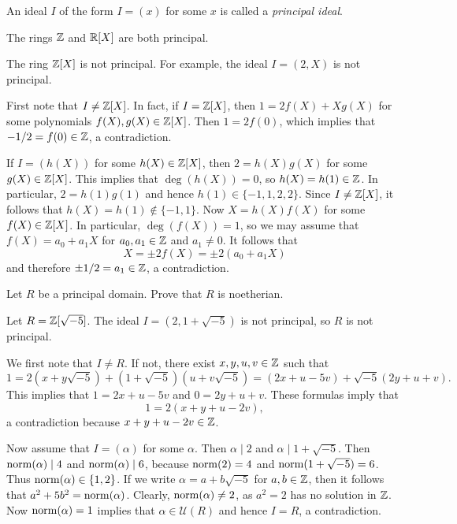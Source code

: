 An ideal $I$ of the form $I=(x)$ for some $x$ is called a \emph{principal ideal}. 

The rings $\mathbb{Z}$ and $\mathbb{R}[X]$ are both principal. 

\begin{example}
	The ring $\mathbb{Z}[X]$ is not principal. For example, the ideal
	$I=(2,X)$ is not principal. 
	
	First note that $I\ne\mathbb{Z}[X]$. In fact, if $I=\mathbb{Z}[X]$, then 
	$1=2f(X)+Xg(X)$ for some polynomials $f(X),g(X)\in\mathbb{Z}[X]$. Then 
	$1=2f(0)$, which implies that $-1/2=f(0)\in\mathbb{Z}$, a contradiction. 
	
	If $I=(h(X))$ for some $h(X)\in\mathbb{Z}[X]$, then $2=h(X)g(X)$ for some $g(X)\in\mathbb{Z}[X]$. This
	implies that $\deg(h(X))=0$, so $h(X)=h(1)\in\mathbb{Z}$. In particular, $2=h(1)g(1)$ and hence
	$h(1)\in\{-1,1,2,2\}$. Since $I\ne\mathbb{Z}[X]$, it follows that $h(X)=h(1)\not\in\{-1,1\}$. Now      
	$X=h(X)f(X)$ for some $f(X)\in\mathbb{Z}[X]$. In particular, $\deg(f(X))=1$, so
	we may assume that $f(X)=a_0+a_1X$ for $a_0,a_1\in\mathbb{Z}$ and $a_1\ne 0$. 	
	It follows that 
	\[
	X=\pm 2f(X)=\pm2(a_0+a_1X)
	\]
	and therefore $\pm1/2=a_1\in\mathbb{Z}$, a contradiction.
\end{example}

\begin{exercise}
\label{xca:principal=>noetherian}
    Let $R$ be a principal domain. Prove that $R$ is noetherian.
\end{exercise}

\begin{example}
	Let $R=\mathbb{Z}[\sqrt{-5}]$.  
	The ideal $I=(2,1+\sqrt{-5})$ is not principal, so $R$ is not principal. 
	
	We first note that $I\ne R$. If not, there exist $x,y,u,v\in\mathbb{Z}$ such that 
	\[
	1=2(x+y\sqrt{-5})+(1+\sqrt{-5})(u+v\sqrt{-5})=(2x+u-5v)+\sqrt{-5}(2y+u+v).
	\]
	This implies that $1=2x+u-5v$ and $0=2y+u+v$. These formulas imply that
	\[
    1=2(x+y+u-2v),
    \]
    a contradiction because $x+y+u-2v\in\mathbb{Z}$. 
	
	Now assume that $I=(\alpha)$ for some $\alpha$. Then $\alpha\mid 2$ and $\alpha\mid 1+\sqrt{-5}$. Then
	$\operatorname{norm}(\alpha)\mid 4$ and $\operatorname{norm}(\alpha)\mid 6$, because $\operatorname{norm}(2)=4$ and $\operatorname{norm}(1+\sqrt{-5})=6$. 
	Thus $\operatorname{norm}(\alpha)\in\{1,2\}$. If we write
	$\alpha=a+b\sqrt{-5}$ for $a,b\in\mathbb{Z}$, then it follows that 
	$a^2+5b^2=\operatorname{norm}(\alpha)$. Clearly, $\operatorname{norm}(\alpha)\ne 2$, as $a^2=2$ has no solution in $\mathbb{Z}$.
	Now $\operatorname{norm}(\alpha)= 1$ implies that $\alpha\in\mathcal{U}(R)$ and hence 
	$I=R$, a contradiction.   
\end{example}

